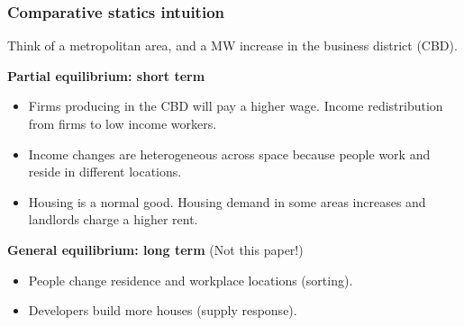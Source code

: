 \documentclass[aspectratio=169, t]{beamer}
\begin{document}
\begin{frame}
	\frametitle{Comparative statics intuition}
    
    \vspace{3mm}
    
	Think of a metropolitan area, and a MW increase in the business district (CBD). 
	
	\vspace{3mm}
	
	\textbf{Partial equilibrium: short term}
	\begin{itemize}
		\vspace{.5mm} \item Firms producing in the CBD will pay a higher wage. Income redistribution 
		from firms to low income workers.
		\vspace{.5mm} \item Income changes are heterogeneous across space because people work 
		and reside in different locations.
		\vspace{.5mm} \item Housing is a normal good. Housing demand in some areas increases 
		and landlords charge a higher rent.
	\end{itemize}

	\pause
	\vspace{3mm}
	\textbf{General equilibrium: long term} (Not this paper!)
	\begin{itemize}
		\vspace{.5mm} \item People change residence and workplace locations (sorting).
		\vspace{.5mm} \item Developers build more houses (supply response).
	\end{itemize}
\end{frame}
\end{document}
